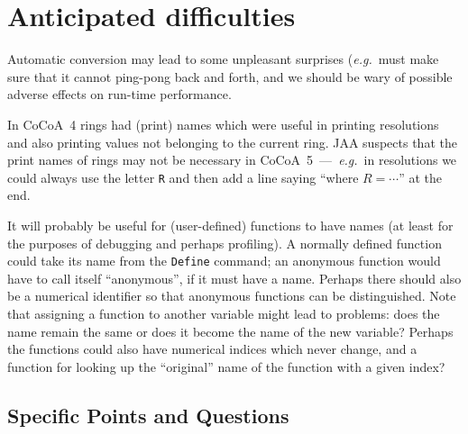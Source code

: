 \documentclass{book}[12,a4paper]
\def\eg{{\it e.g.}}
\begin{document}
\chapter{Anticipated difficulties}

Automatic conversion may lead to some unpleasant surprises (\eg~must
make sure that it cannot ping-pong back and forth, and we should be
wary of possible adverse effects on run-time performance.

In CoCoA~4 rings had (print) names which were useful in printing resolutions
and also printing values not belonging to the current ring.  JAA suspects that
the print names of rings may not be necessary in CoCoA~5~---~\eg~in resolutions
we could always use the letter \texttt{R} and then add a line saying ``where $R=\cdots$''
at the end.

It will probably be useful for (user-defined) functions to have names (at least for the
purposes of debugging and perhaps profiling).  A normally defined function
could take its name from the \texttt{Define} command; an anonymous function
would have to call itself ``anonymous'', if it must have a name.  Perhaps
there should also be a numerical identifier so that anonymous functions
can be distinguished.  Note that assigning a function to another variable
might lead to problems: does the name remain the same or does it become
the name of the new variable?  Perhaps the functions could also have numerical
indices which never change, and a function for looking up the ``original''
name of the function with a given index?

\section{Specific Points and Questions}
\end{document}
